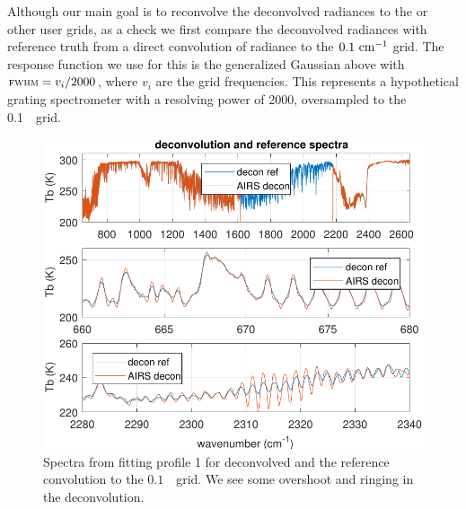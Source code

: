 \documentclass[journal]{IEEEtran}
\begin{document}
Although our main goal is to reconvolve the deconvolved {\airs}
radiances to the {\cris} or other user grids, as a check we first
compare the deconvolved radiances with reference truth from a direct
convolution of {\kcarta} radiance to the $0.1~\mbox{cm$^{-1}$}$ grid.  The
response function we use for this is the generalized Gaussian above
with ${\mbox{\small\textsc{fwhm}}} = v_i / 2000$, where $v_i$ are the grid frequencies.
This represents a hypothetical grating spectrometer with a resolving
power of 2000, oversampled to the 0.1~\wn\ grid.



\begin{figure} %
  \centering
  \includegraphics[width=\linewidth]{figures/airs_decon_spec.pdf}
  \caption{Spectra from fitting profile 1 for deconvolved {\airs}
    and the reference convolution to the $0.1$~\wn\ grid.  We see
    some overshoot and ringing in the deconvolution.}
  \label{dspec}
\end{figure}
\end{document}
